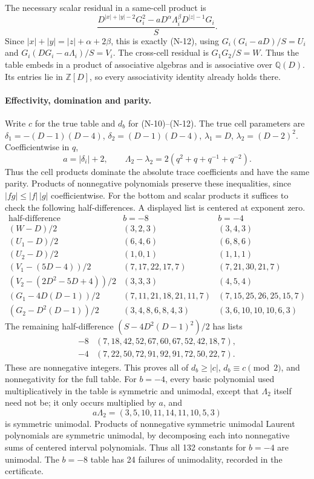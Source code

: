 The necessary scalar residual in a same-cell product is
\[
 \frac{D^{|x|+|y|-2}G_i^2-
 aD^\alpha\Lambda_i^\beta D^{|z|-1}G_i}{S}.
\]
Since $|x|+|y|=|z|+\alpha+2\beta$, this is exactly (N-12), using
$G_i(G_i-aD)/S=U_i$ and
$G_i(DG_i-a\Lambda_i)/S=V_i$.
The cross-cell residual is $G_1G_2/S=W$.
Thus the table embeds in a product of associative algebras and is
associative over $\mathbb Q(D)$.  Its entries lie in $\mathbb Z[D]$,
so every associativity identity already holds there.

\paragraph{Effectivity, domination and parity.}
Write $c$ for the true table and $d_b$ for (N-10)--(N-12).
The true cell parameters are
$\delta_1=-(D-1)(D-4)$, $\delta_2=(D-1)(D-4)$,
$\lambda_1=D$, $\lambda_2=(D-2)^2$.
Coefficientwise in $q$,
\[
 a=|\delta_i|+2,\qquad
 \Lambda_2-\lambda_2=2(q^2+q+q^{-1}+q^{-2}).
\]
Thus the cell products dominate the absolute trace coefficients and
have the same parity.  Products of nonnegative polynomials preserve
these inequalities, since $|fg|\le |f|\,|g|$ coefficientwise.
For the bottom and scalar products it suffices to check the following
half-differences.  A displayed list is centered at exponent zero.
\[
\begin{array}{c|c|c}
\text{half-difference}&b=-8&b=-4\\\hline
(W-D)/2&(3,2,3)&(3,4,3)\\
(U_1-D)/2&(6,4,6)&(6,8,6)\\
(U_2-D)/2&(1,0,1)&(1,1,1)\\
(V_1-(5D-4))/2&(7,17,22,17,7)&(7,21,30,21,7)\\
(V_2-(2D^2-5D+4))/2&(3,3,3)&(4,5,4)\\
(G_1-4D(D-1))/2&(7,11,21,18,21,11,7)&(7,15,25,26,25,15,7)\\
(G_2-D^2(D-1))/2&(3,4,8,6,8,4,3)&(3,6,10,10,10,6,3)
\end{array}
\tag{N-13}
\]
The remaining half-difference $(S-4D^2(D-1)^2)/2$ has lists
\[
\begin{array}{c|l}
-8&(7,18,42,52,67,60,67,52,42,18,7),\\
-4&(7,22,50,72,91,92,91,72,50,22,7).
\end{array}
\]
These are nonnegative integers.  This proves all of
$d_b\ge |c|$, $d_b\equiv c\pmod2$, and nonnegativity for the full table.
For $b=-4$, every basic polynomial used multiplicatively in the table
is symmetric and unimodal, except that $\Lambda_2$ itself need not be;
it only occurs multiplied by $a$, and
\[
 a\Lambda_2=(3,5,10,11,14,11,10,5,3)
\]
is symmetric unimodal.  Products of nonnegative symmetric unimodal
Laurent polynomials are symmetric unimodal, by decomposing each into
nonnegative sums of centered interval polynomials.  Thus all 132
constants for $b=-4$ are unimodal.  The $b=-8$ table has 24 failures of
unimodality, recorded in the certificate.

